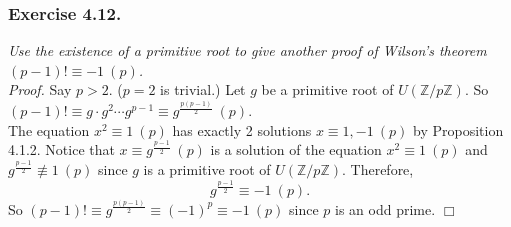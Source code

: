 \documentclass{article}
\begin{document}



\subsubsection*{Exercise 4.12.}
\emph{Use the existence of a primitive root to give another proof
of Wilson's theorem $(p - 1)! \equiv -1 \: (p)$.} \\

\emph{Proof.}
Say $p > 2$. ($p = 2$ is trivial.)
Let $g$ be a primitive root of $U(\mathbb{Z}/p\mathbb{Z})$.
So $(p - 1)! \equiv g \cdot g^2 \cdots g^{p - 1} \equiv g^{\frac{p(p - 1)}{2}} \: (p)$. \\

The equation $x^2 \equiv 1 \: (p)$ has exactly 2 solutions $x \equiv 1, -1 \: (p)$
by Proposition 4.1.2.
Notice that $x \equiv g^{\frac{p - 1}{2}} \: (p)$ is a solution of the equation
$x^2 \equiv 1 \: (p)$ and $g^{\frac{p - 1}{2}} \not\equiv 1 \: (p)$
since $g$ is a primitive root of $U(\mathbb{Z}/p\mathbb{Z})$.
Therefore, $$g^{\frac{p - 1}{2}} \equiv -1 \: (p).$$
So $(p - 1)! \equiv g^{\frac{p(p - 1)}{2}} \equiv (-1)^p \equiv -1 \: (p)$
since $p$ is an odd prime.
$\Box$ \\
\end{document}
